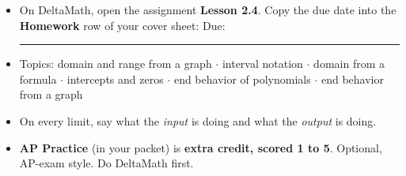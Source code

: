 \documentclass[aspectratio=169, 11pt]{beamer}
\begin{document}
\begin{frame}[t, plain]

  \begin{itemize}\setlength{\itemsep}{6pt}
    \item On DeltaMath, open the assignment \textbf{Lesson 2.4}. Copy the due date into the
          \textbf{Homework} row of your cover sheet: \quad Due: \rule{3cm}{0.4pt}
    \item Topics: domain and range from a graph $\cdot$ interval notation $\cdot$ domain from a
          formula $\cdot$ intercepts and zeros $\cdot$ end behavior of polynomials $\cdot$ end
          behavior from a graph
    \item On every limit, say what the \textit{input} is doing and what the \textit{output}
          is doing.
    \item \textbf{AP Practice} (in your packet) is \textbf{extra credit, scored 1 to 5}. Optional,
          AP-exam style. Do DeltaMath first.
  \end{itemize}
\end{frame}
\end{document}
